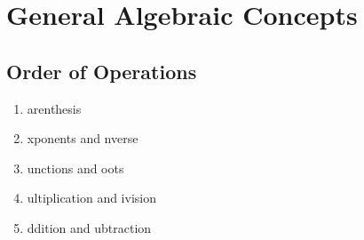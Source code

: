 \section{General Algebraic Concepts}

\subsection*{Order of Operations}
\begin{enumerate}
  \item {}arenthesis
  \item {}xponents and nverse
  \item {}unctions and oots
  \item {}ultiplication and ivision
  \item {}ddition and ubtraction
\end{enumerate}

